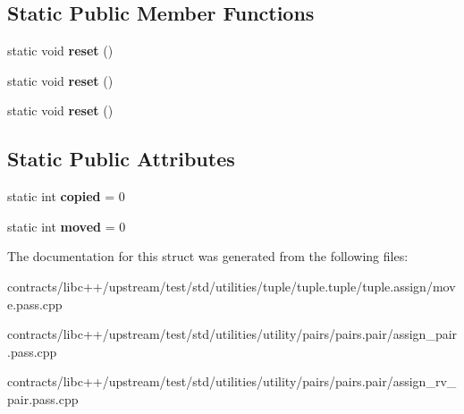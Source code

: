 \subsection*{Static Public Member Functions}
\begin{DoxyCompactItemize}
\item 
\mbox{\label{struct_count_assign_a1722183b074e4b6e2f03d09fc4024d2a}} 
static void {\bfseries reset} ()
\item 
\mbox{\label{struct_count_assign_a1722183b074e4b6e2f03d09fc4024d2a}} 
static void {\bfseries reset} ()
\item 
\mbox{\label{struct_count_assign_a1722183b074e4b6e2f03d09fc4024d2a}} 
static void {\bfseries reset} ()
\end{DoxyCompactItemize}
\subsection*{Static Public Attributes}
\begin{DoxyCompactItemize}
\item 
\mbox{\label{struct_count_assign_ada421e871be7ab3b38c484144344a791}} 
static int {\bfseries copied} = 0
\item 
\mbox{\label{struct_count_assign_a8fc561b9ac7401ef2a8f3f0b3009629a}} 
static int {\bfseries moved} = 0
\end{DoxyCompactItemize}


The documentation for this struct was generated from the following files\+:\begin{DoxyCompactItemize}
\item 
contracts/libc++/upstream/test/std/utilities/tuple/tuple.\+tuple/tuple.\+assign/move.\+pass.\+cpp\item 
contracts/libc++/upstream/test/std/utilities/utility/pairs/pairs.\+pair/assign\+\_\+pair.\+pass.\+cpp\item 
contracts/libc++/upstream/test/std/utilities/utility/pairs/pairs.\+pair/assign\+\_\+rv\+\_\+pair.\+pass.\+cpp\end{DoxyCompactItemize}

